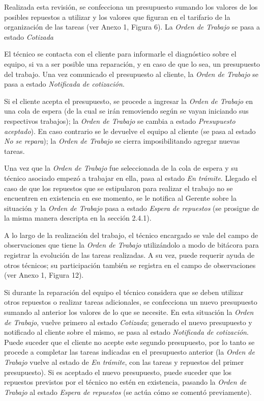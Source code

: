 \documentclass[12pt]{extarticle}
\begin{document}
\begin{spacing}{1.2}
    Realizada esta revisión, se confecciona un presupuesto sumando los valores de los posibles repuestos a utilizar y los valores que figuran en el tarifario de la organización de las tareas (ver Anexo 1, Figura 6). La \textit{Orden de Trabajo} se pasa a estado \textit{Cotizada}
    
    El técnico se contacta con el cliente para informarle el diagnóstico sobre el equipo, si va a ser posible una reparación, y en caso de que lo sea, un presupuesto del trabajo. Una vez comunicado el presupuesto al cliente, la \textit{Orden de Trabajo} se pasa a estado \textit{Notificada de cotización}. 
    
    Si el cliente acepta el presupuesto, se procede a ingresar la \textit{Orden de Trabajo} en una cola de espera (de la cual se irán removiendo según se vayan iniciando sus respectivos trabajos); la \textit{Orden de Trabajo} se cambia a estado \textit{Presupuesto aceptado}). En caso contrario se le devuelve el equipo al cliente (se pasa al estado \textit{No se repara}); la \textit{Orden de Trabajo} se cierra imposibilitando agregar nuevas tareas.
    
    Una vez que la \textit{Orden de Trabajo} fue seleccionada de la cola de espera y su técnico asociado empezó a trabajar en ella, pasa al estado \textit{En trámite}. Llegado el caso de que los repuestos que se estipularon para realizar el trabajo no se encuentren en existencia en ese momento, se le notifica al Gerente sobre la situación y la \textit{Orden de Trabajo} pasa a estado \textit{Espera de repuestos} (se prosigue de la misma manera descripta en la sección 2.4.1).

    A lo largo de la realización del trabajo, el técnico encargado se vale del campo de observaciones que tiene la \textit{Orden de Trabajo} utilizándolo a modo de bitácora para registrar la evolución de las tareas realizadas. A su vez, puede requerir ayuda de otros técnicos; su participación también se registra en el campo de observaciones (ver Anexo 1, Figura 12). 
    
    Si durante la reparación del equipo el técnico considera que se deben utilizar otros repuestos o realizar tareas adicionales, se confecciona un nuevo presupuesto sumando al anterior los valores de lo que se necesite. En esta situación la \textit{Orden de Trabajo}, vuelve primero al estado \textit{Cotizada}; generado el nuevo presupuesto y notificado al cliente sobre el mismo, se pasa al estado \textit{Notificada de cotización}. Puede suceder que el cliente no acepte este segundo presupuesto, por lo tanto se procede a completar las tareas indicadas en el presupuesto anterior (la \textit{Orden de Trabajo} vuelve al estado de \textit{En trámite}, con las tareas y repuestos del primer presupuesto). Si es aceptado el nuevo presupuesto, puede suceder que los repuestos previstos por el técnico no estén en existencia, pasando la \textit{Orden de Trabajo} al estado \textit{Espera de repuestos} (se actúa cómo se comentó previamente).
    

\end{spacing}
\end{document}
